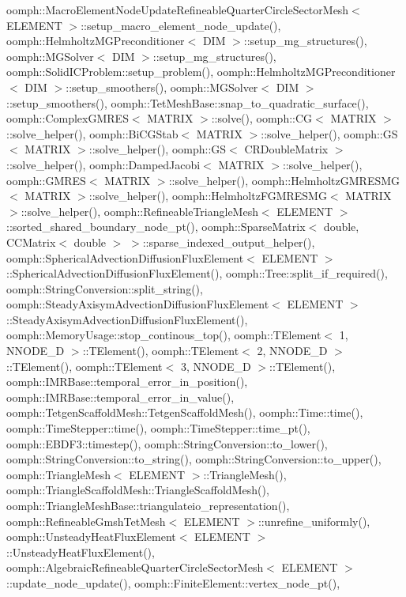 oomph\+::\+Macro\+Element\+Node\+Update\+Refineable\+Quarter\+Circle\+Sector\+Mesh$<$ E\+L\+E\+M\+E\+N\+T $>$\+::setup\+\_\+macro\+\_\+element\+\_\+node\+\_\+update(), oomph\+::\+Helmholtz\+M\+G\+Preconditioner$<$ D\+I\+M $>$\+::setup\+\_\+mg\+\_\+structures(), oomph\+::\+M\+G\+Solver$<$ D\+I\+M $>$\+::setup\+\_\+mg\+\_\+structures(), oomph\+::\+Solid\+I\+C\+Problem\+::setup\+\_\+problem(), oomph\+::\+Helmholtz\+M\+G\+Preconditioner$<$ D\+I\+M $>$\+::setup\+\_\+smoothers(), oomph\+::\+M\+G\+Solver$<$ D\+I\+M $>$\+::setup\+\_\+smoothers(), oomph\+::\+Tet\+Mesh\+Base\+::snap\+\_\+to\+\_\+quadratic\+\_\+surface(), oomph\+::\+Complex\+G\+M\+R\+E\+S$<$ M\+A\+T\+R\+I\+X $>$\+::solve(), oomph\+::\+C\+G$<$ M\+A\+T\+R\+I\+X $>$\+::solve\+\_\+helper(), oomph\+::\+Bi\+C\+G\+Stab$<$ M\+A\+T\+R\+I\+X $>$\+::solve\+\_\+helper(), oomph\+::\+G\+S$<$ M\+A\+T\+R\+I\+X $>$\+::solve\+\_\+helper(), oomph\+::\+G\+S$<$ C\+R\+Double\+Matrix $>$\+::solve\+\_\+helper(), oomph\+::\+Damped\+Jacobi$<$ M\+A\+T\+R\+I\+X $>$\+::solve\+\_\+helper(), oomph\+::\+G\+M\+R\+E\+S$<$ M\+A\+T\+R\+I\+X $>$\+::solve\+\_\+helper(), oomph\+::\+Helmholtz\+G\+M\+R\+E\+S\+M\+G$<$ M\+A\+T\+R\+I\+X $>$\+::solve\+\_\+helper(), oomph\+::\+Helmholtz\+F\+G\+M\+R\+E\+S\+M\+G$<$ M\+A\+T\+R\+I\+X $>$\+::solve\+\_\+helper(), oomph\+::\+Refineable\+Triangle\+Mesh$<$ E\+L\+E\+M\+E\+N\+T $>$\+::sorted\+\_\+shared\+\_\+boundary\+\_\+node\+\_\+pt(), oomph\+::\+Sparse\+Matrix$<$ double, C\+C\+Matrix$<$ double $>$ $>$\+::sparse\+\_\+indexed\+\_\+output\+\_\+helper(), oomph\+::\+Spherical\+Advection\+Diffusion\+Flux\+Element$<$ E\+L\+E\+M\+E\+N\+T $>$\+::\+Spherical\+Advection\+Diffusion\+Flux\+Element(), oomph\+::\+Tree\+::split\+\_\+if\+\_\+required(), oomph\+::\+String\+Conversion\+::split\+\_\+string(), oomph\+::\+Steady\+Axisym\+Advection\+Diffusion\+Flux\+Element$<$ E\+L\+E\+M\+E\+N\+T $>$\+::\+Steady\+Axisym\+Advection\+Diffusion\+Flux\+Element(), oomph\+::\+Memory\+Usage\+::stop\+\_\+continous\+\_\+top(), oomph\+::\+T\+Element$<$ 1, N\+N\+O\+D\+E\+\_\+D $>$\+::\+T\+Element(), oomph\+::\+T\+Element$<$ 2, N\+N\+O\+D\+E\+\_\+D $>$\+::\+T\+Element(), oomph\+::\+T\+Element$<$ 3, N\+N\+O\+D\+E\+\_\+D $>$\+::\+T\+Element(), oomph\+::\+I\+M\+R\+Base\+::temporal\+\_\+error\+\_\+in\+\_\+position(), oomph\+::\+I\+M\+R\+Base\+::temporal\+\_\+error\+\_\+in\+\_\+value(), oomph\+::\+Tetgen\+Scaffold\+Mesh\+::\+Tetgen\+Scaffold\+Mesh(), oomph\+::\+Time\+::time(), oomph\+::\+Time\+Stepper\+::time(), oomph\+::\+Time\+Stepper\+::time\+\_\+pt(), oomph\+::\+E\+B\+D\+F3\+::timestep(), oomph\+::\+String\+Conversion\+::to\+\_\+lower(), oomph\+::\+String\+Conversion\+::to\+\_\+string(), oomph\+::\+String\+Conversion\+::to\+\_\+upper(), oomph\+::\+Triangle\+Mesh$<$ E\+L\+E\+M\+E\+N\+T $>$\+::\+Triangle\+Mesh(), oomph\+::\+Triangle\+Scaffold\+Mesh\+::\+Triangle\+Scaffold\+Mesh(), oomph\+::\+Triangle\+Mesh\+Base\+::triangulateio\+\_\+representation(), oomph\+::\+Refineable\+Gmsh\+Tet\+Mesh$<$ E\+L\+E\+M\+E\+N\+T $>$\+::unrefine\+\_\+uniformly(), oomph\+::\+Unsteady\+Heat\+Flux\+Element$<$ E\+L\+E\+M\+E\+N\+T $>$\+::\+Unsteady\+Heat\+Flux\+Element(), oomph\+::\+Algebraic\+Refineable\+Quarter\+Circle\+Sector\+Mesh$<$ E\+L\+E\+M\+E\+N\+T $>$\+::update\+\_\+node\+\_\+update(), oomph\+::\+Finite\+Element\+::vertex\+\_\+node\+\_\+pt(), 